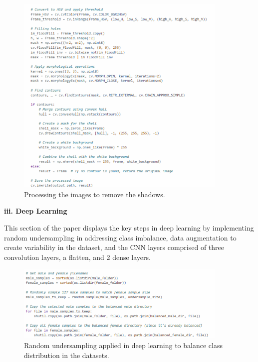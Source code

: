 \begin{figure}[!htbp]
	\centering
	\includegraphics[width=0.9\textwidth, angle=0]{figures/shadow_remove.png}
	\caption{Processing the images to remove the shadows.}
\end{figure}

\newpage

\noindent\textbf{iii. Deep Learning}
\vspace{-0.5cm}

This section of the paper displays the key steps in deep learning by implementing random undersampling in addressing class imbalance, data augmentation to create variability in the dataset, and the CNN layers comprised of three convolution layers, a flatten, and 2 dense layers. 


\begin{figure}[!htbp]
	\centering
	\includegraphics[width=0.9\textwidth, angle=0]{figures/random_undersampling_DL.png}
	\caption{Random undersampling applied in deep learning to balance class distribution in the datasets.}
\end{figure}

